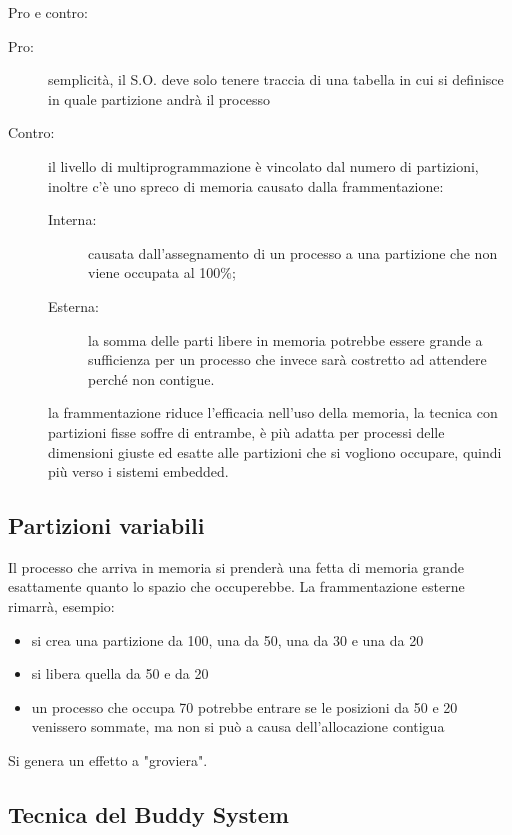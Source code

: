 \documentclass[a4paper, 12pt]{book}
\begin{document}
Pro e contro:

\begin{description}
    \item[Pro:] semplicità, il S.O. deve solo tenere traccia di una tabella in cui si definisce in quale partizione andrà il processo
    \item[Contro:] il livello di multiprogrammazione è vincolato dal numero di partizioni, inoltre c'è uno spreco di memoria causato
    dalla frammentazione:
    
    \begin{description}
        \item[Interna:] causata dall'assegnamento di un processo a una partizione che non viene occupata al 100\%;
        \item[Esterna:] la somma delle parti libere in memoria potrebbe essere grande a sufficienza
        per un processo che invece sarà costretto ad attendere perché non contigue.
    \end{description}
    la frammentazione riduce l'efficacia nell'uso della memoria, la tecnica con partizioni fisse soffre di entrambe, è più adatta per
    processi delle dimensioni giuste ed esatte alle partizioni che si vogliono occupare, quindi più verso i sistemi embedded.
\end{description}

\subsection{Partizioni variabili}

Il processo che arriva in memoria si prenderà una fetta di memoria grande esattamente quanto lo spazio che occuperebbe.
La frammentazione esterne rimarrà, esempio:

\begin{itemize}
    \item si crea una partizione da 100, una da 50, una da 30 e una da 20
    \item si libera quella da 50 e da 20
    \item un processo che occupa 70 potrebbe entrare se le posizioni da 50 e 20 venissero sommate, ma non si può a causa dell'allocazione contigua
\end{itemize}

Si genera un effetto a "groviera". 
 
\subsection{Tecnica del Buddy System}
\end{document}
